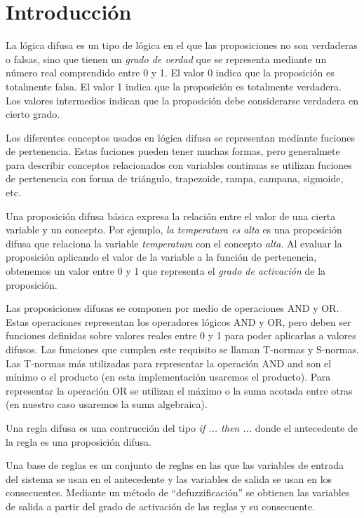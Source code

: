 \section{Introducción}
La lógica difusa es un tipo de lógica en el que las proposiciones no
son verdaderas o falsas, sino que tienen un \emph{grado de verdad} que se
representa mediante un número real comprendido entre 0 y 1. El valor 0
indica que la proposición es totalmente falsa. El valor 1 indica que
la proposición es totalmente verdadera. Los valores intermedios
indican que la proposición debe considerarse verdadera en cierto
grado.

Los diferentes conceptos usados en lógica difusa se representan
mediante fuciones de pertenencia. Estas fuciones pueden tener muchas
formas, pero generalmete para describir conceptos relacionados con
variables continuas se utilizan fuciones de pertenencia con forma de
triángulo, trapezoide, rampa, campana, sigmoide, etc.

Una proposición difusa básica expresa la relación entre el valor de
una cierta variable y un concepto. Por ejemplo, \emph{la temperatura es
alta} es una proposición difusa que relaciona la variable \emph{temperatura}
con el concepto \emph{alta}. Al evaluar la proposición aplicando el
valor de la variable a la función de pertenencia, obtenemos un valor
entre 0 y 1 que representa el \emph{grado de activación} de la proposición.

Las proposiciones difusas se componen por medio de operaciones AND y
OR. Estas operaciones representan los operadores lógicos AND y OR,
pero deben ser funciones definidas sobre valores reales entre 0 y 1
para poder aplicarlas a valores difusos. Las funciones que cumplen
este requisito se llaman T-normas y S-normas. Las T-normas más
utilizadas para representar la operación AND and son el mínimo o el
producto (en esta implementación usaremos el producto). Para
representar la operación OR se utilizan el máximo o la suma acotada
entre otras (en nuestro caso usaremos la suma algebraica).

Una regla difusa es una contrucción del tipo \emph{if ... then ...}
donde el antecedente de la regla es una proposición difusa.

Una base de reglas es un conjunto de reglas en las que las variables
de entrada del sistema se usan en el antecedente y las variables de
salida se usan en los consecuentes. Mediante un método de
``defuzzificación'' se obtienen las variables de salida a partir del
grado de activación de las reglas y su consecuente.